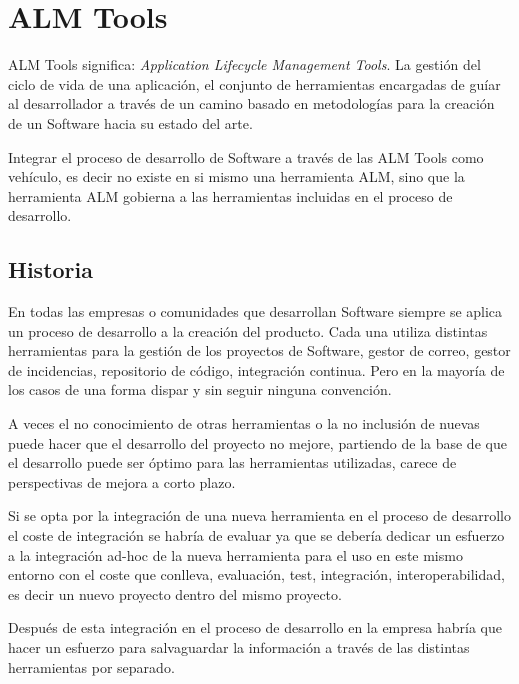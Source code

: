 \chapter{ALM Tools}
\label{chap:almtools}

\par ALM Tools significa: \emph{Application Lifecycle Management Tools}. La gesti\'on del ciclo de vida de una aplicaci\'on, el conjunto de herramientas encargadas de gu\'iar al desarrollador a trav\'es de un camino basado en metodolog\'ias para la creaci\'on de un Software hacia su estado del arte.

\par Integrar el proceso de desarrollo de Software a trav\'es de las ALM Tools como veh\'iculo, es decir no existe en si mismo una herramienta ALM, sino que la herramienta ALM gobierna a las herramientas incluidas en el proceso de desarrollo.

\section{Historia}
\label{sec:historia}

\par En todas las empresas o comunidades que desarrollan Software siempre se aplica un proceso de desarrollo a la creación del producto. Cada una utiliza distintas herramientas para la gesti\'on de los proyectos de Software, gestor de correo, gestor de incidencias, repositorio de c\'odigo, integraci\'on continua. Pero en la mayor\'ia de los casos de una forma dispar y sin seguir ninguna convención.

\par A veces el no conocimiento de otras herramientas o la no inclusión de nuevas puede hacer que el desarrollo del proyecto no mejore, partiendo de la base de que el desarrollo puede ser óptimo para las herramientas utilizadas, carece de perspectivas de mejora a corto plazo.

\par Si se opta por la integración de una nueva herramienta en el proceso de desarrollo el coste de integración se habría de evaluar ya que se debería dedicar un esfuerzo a la integración ad-hoc de la nueva herramienta para el uso en este mismo entorno con el coste que conlleva, evaluación, test, integración, interoperabilidad, es decir un nuevo proyecto dentro del mismo proyecto.

\par Después de esta integración en el proceso de desarrollo en la empresa habría que hacer un esfuerzo para salvaguardar la información a través de las distintas herramientas por separado.

